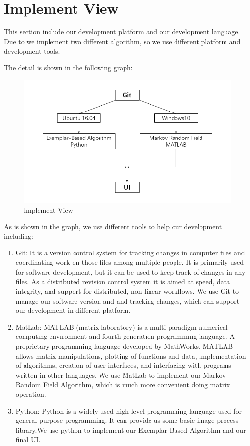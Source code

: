 \section{Implement View}
\qquad This section include our development platform and our development language. Due to we implement two different algorithm, so we use different platform and development tools.

The detail is shown in the following graph:
\begin{figure}[H]
	\centering
	\includegraphics[width=1.0\linewidth]{implement.jpg}
	\caption{Implement View}
\end{figure}
As is shown in the graph, we use different tools to help our development including:
\begin{enumerate}
	\item Git: It is a version control system for tracking changes in computer files and coordinating work on those files among multiple people. It is primarily used for software development, but it can be used to keep track of changes in any files. As a distributed revision control system it is aimed at speed, data integrity, and support for distributed, non-linear workflows. We use Git to manage our software version and and tracking changes, which can support our development in different platform.
	\item MatLab: MATLAB (matrix laboratory) is a multi-paradigm numerical computing environment and fourth-generation programming language. A proprietary programming language developed by MathWorks, MATLAB allows matrix manipulations, plotting of functions and data, implementation of algorithms, creation of user interfaces, and interfacing with programs written in other languages. We use MatLab to implement our Markov Random Field Algorithm, which is much more convenient doing matrix operation.
	\item Python: Python is a widely used high-level programming language used for general-purpose programming. It can provide us some basic image process library.We use python to implement our Exemplar-Based Algorithm and our final UI.
\end{enumerate}
